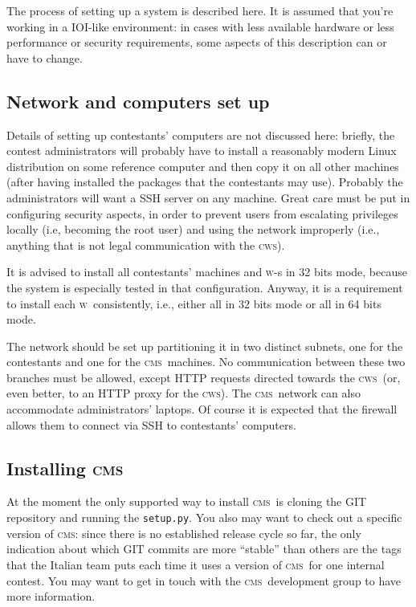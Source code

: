 \documentclass[a4paper,8pt]{amsart}
\newcommand{\CMS}{\textsc{cms}}
\newcommand{\WS}{\textsc{w}}
\newcommand{\CWS}{\textsc{cws}}
\newcommand{\file}[1]{\texttt{#1}}
\begin{document}
\begin{multicols}{2}
  The process of setting up a system is described here. It is assumed
  that you're working in a IOI-like environment: in cases with less
  available hardware or less performance or security requirements,
  some aspects of this description can or have to change.

  \subsection{Network and computers set up}

  Details of setting up contestants' computers are not discussed here:
  briefly, the contest administrators will probably have to install a
  reasonably modern Linux distribution on some reference computer and
  then copy it on all other machines (after having installed the
  packages that the contestants may use). Probably the administrators
  will want a SSH server on any machine. Great care must be put in
  configuring security aspects, in order to prevent users from
  escalating privileges locally (i.e, becoming the root user) and
  using the network improperly (i.e., anything that is not legal
  communication with the \CWS).

  It is advised to install all contestants' machines and \WS-s in 32
  bits mode, because the system is especially tested in that
  configuration. Anyway, it is a requirement to install each
  \WS\ consistently, i.e., either all in 32 bits mode or all in 64
  bits mode.

  The network should be set up partitioning it in two distinct
  subnets, one for the contestants and one for the \CMS\ machines. No
  communication between these two branches must be allowed, except
  HTTP requests directed towards the \CWS\ (or, even better, to an
  HTTP proxy for the \CWS). The \CMS\ network can also accommodate
  administrators' laptops. Of course it is expected that the firewall
  allows them to connect via SSH to contestants' computers.

  \subsection{Installing \CMS}

  At the moment the only supported way to install \CMS\ is cloning the
  GIT repository and running the \file{setup.py}. You also may want to
  check out a specific version of \CMS: since there is no established
  release cycle so far, the only indication about which GIT commits
  are more ``stable'' than others are the tags that the Italian team
  puts each time it uses a version of \CMS\ for one internal
  contest. You may want to get in touch with the \CMS\ development
  group to have more information.


\end{multicols}
\end{document}
